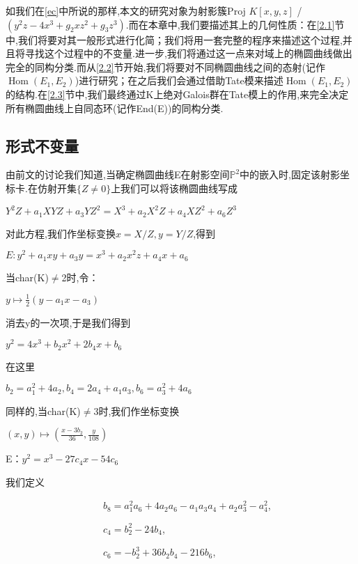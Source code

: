 \documentclass[11pt]{ctexart}
\DeclareMathOperator{\Hom}{Hom}
\begin{document}
如我们在\ref{ec}中所说的那样,本文的研究对象为射影簇Proj $K[x, y, z]$ / $(y^2z-4x^3+g_2xz^2+g_3z^3)$.而在本章中,我们要描述其上的几何性质：在\ref{2.1}节中,我们将要对其一般形式进行化简；我们将用一套完整的程序来描述这个过程,并且将寻找这个过程中的不变量.进一步,我们将通过这一点来对域上的椭圆曲线做出完全的同构分类.而从\ref{2.2}节开始,我们将要对不同椭圆曲线之间的态射(记作$\Hom(E_1,E_2)$)进行研究；在之后我们会通过借助Tate模来描述$\Hom(E_1,E_2)$的结构.在\ref{2.3}节中,我们最终通过K上绝对Galois群在Tate模上的作用,来完全决定所有椭圆曲线上自同态环(记作End(E))的同构分类.

\subsection{形式不变量\label{2.1}}

由前文的讨论我们知道,当确定椭圆曲线E在射影空间$\mathbb{P}^2$中的嵌入时,固定该射影坐标卡.在仿射开集$\{Z\neq 0\}$上我们可以将该椭圆曲线写成
\begin{center}
    $Y^2Z+a_1XYZ+a_3YZ^2=X^3+a_2X^2Z+a_4XZ^2+a_6Z^3$
\end{center}
\noindent 对此方程,我们作坐标变换$x=X/Z$$,y=Y/Z$,得到

\begin{center}
    $E:y^2+a_1xy+a_3y=x^3+a_2x^2z+a_4x+a_6$
\end{center}
\noindent 当char(K)$\neq$2时,令：

\begin{center}
    $y\longmapsto \frac{1}{2}(y-a_1x-a_3)$
\end{center}
\noindent 消去y的一次项,于是我们得到
\begin{center}
    $y^2=4x^3+b_2x^2+2b_4x+b_6$\label{2s}
\end{center}
\noindent 在这里
\begin{center}
    $b_2=a_1^2+4a_2$$,b_4=2a_4+a_1a_3$$,b_6=a_3^2+4a_6$
\end{center}
\noindent 同样的,当char(K)$\neq$3时,我们作坐标变换

\begin{center}
    $(x,y)\longmapsto (\frac{x-3b_2}{36},\frac{y}{108})$

    E：$y^2=x^3-27c_4x-54c_6$
\end{center}
\noindent 我们定义


~~~~~~~~~~~~~~~~~~~~$b_8=a_1^2a_6+4a_2a_6-a_1a_3a_4+a_2a_3^2-a_4^2$,

~~~~~~~~~~~~~~~~~~~~$c_4=b_2^2-24b_4$,

~~~~~~~~~~~~~~~~~~~~$c_6=-b_2^3+36b_2b_4-216b_6$,
\end{document}
